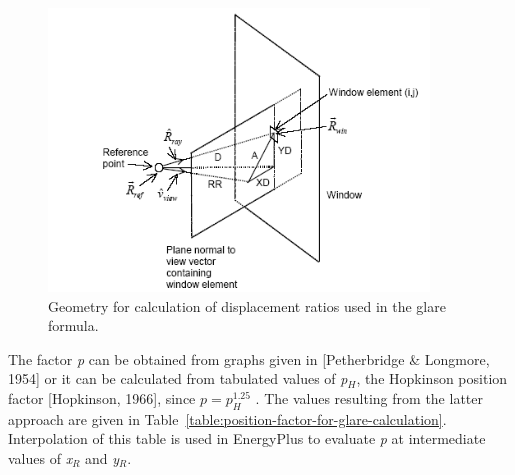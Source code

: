 \begin{figure}[hbtp] %
\centering
\includegraphics[width=0.9\textwidth, height=0.9\textheight, keepaspectratio=true]{media/image794.png}
\caption{Geometry for calculation of displacement ratios used in the glare formula. \protect \label{fig:geometry-for-calculation-of-displacement}}
\end{figure}

The factor \emph{p} can be obtained from graphs given in {[}Petherbridge \& Longmore, 1954{]} or it can be calculated from tabulated values of \emph{p\(_{H}\)}, the Hopkinson position factor {[}Hopkinson, 1966{]}, since \(p = p_H^{1.25}\) . The values resulting from the latter approach are given in Table~\ref{table:position-factor-for-glare-calculation}. Interpolation of this table is used in EnergyPlus to evaluate \emph{p} at intermediate values of \emph{x\(_{R}\)} and \emph{y\(_{R}\)}.

